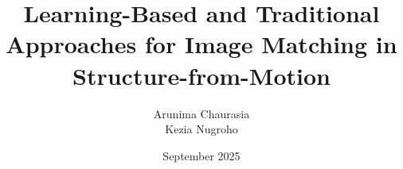 \documentclass[dlrv]{mas_report}
\author{Arunima Chaurasia \\
\hspace{0.1cm} Kezia Nugroho \\}
\title{Learning-Based and Traditional Approaches for Image Matching in Structure-from-Motion }
\date{September 2025}
\begin{document}
\frontmatter

\begin{titlepage}
    \maketitle
\end{titlepage}

{}

\pagestyle{plain}

\statementpage




\tableofcontents


\mainmatter %

\pagestyle{mainmatter}




%



\begin{appendices}
    
\end{appendices}

\backmatter


\end{document}
